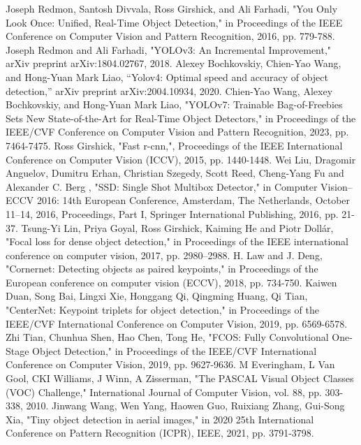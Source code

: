\documentclass[lettersize,journal]{IEEEtran}
\begin{document}
\begin{thebibliography}{99}
 Joseph Redmon, Santosh Divvala, Ross Girshick, and Ali Farhadi, "You Only Look Once: Unified, Real-Time Object Detection," in Proceedings of the IEEE Conference on Computer Vision and Pattern Recognition, 2016, pp. 779-788.
Joseph Redmon and Ali Farhadi, "YOLOv3: An Incremental Improvement," arXiv preprint arXiv:1804.02767, 2018.
Alexey Bochkovskiy, Chien-Yao Wang, and Hong-Yuan Mark Liao,
“Yolov4: Optimal speed and accuracy of object detection,” arXiv preprint
arXiv:2004.10934, 2020.
 Chien-Yao Wang, Alexey Bochkovskiy, and Hong-Yuan Mark Liao, "YOLOv7: Trainable Bag-of-Freebies Sets New State-of-the-Art for Real-Time Object Detectors," in Proceedings of the IEEE/CVF Conference on Computer Vision and Pattern Recognition, 2023, pp. 7464-7475.
Ross Girshick, "Fast r-cnn,", Proceedings of the IEEE International Conference on Computer Vision (ICCV), 2015, pp. 1440-1448.
Wei Liu, Dragomir Anguelov, Dumitru Erhan, Christian Szegedy, Scott Reed, Cheng-Yang Fu and Alexander C. Berg , "SSD: Single Shot Multibox Detector," in Computer Vision–ECCV 2016: 14th European Conference, Amsterdam, The Netherlands, October 11–14, 2016, Proceedings, Part I, Springer International Publishing, 2016, pp. 21-37.
Tsung-Yi Lin, Priya Goyal, Ross Girshick, Kaiming He and Piotr
Dollár, "Focal loss for dense object detection," in Proceedings of the
IEEE international conference on computer vision, 2017, pp. 2980–2988.
H. Law and J. Deng, "Cornernet: Detecting objects as paired keypoints," in Proceedings of the European conference on computer vision (ECCV), 2018, pp. 734-750.
Kaiwen Duan, Song Bai, Lingxi Xie, Honggang Qi, Qingming Huang, Qi Tian, "CenterNet: Keypoint triplets for object detection," in Proceedings of the IEEE/CVF International Conference on Computer Vision, 2019, pp. 6569-6578.
Zhi Tian, Chunhua Shen, Hao Chen, Tong He, "FCOS: Fully Convolutional One-Stage Object Detection," in Proceedings of the IEEE/CVF International Conference on Computer Vision, 2019, pp. 9627-9636.
M Everingham, L Van Gool, CKI Williams, J Winn, A Zisserman, "The PASCAL Visual Object Classes (VOC) Challenge," International Journal of Computer Vision, vol. 88, pp. 303-338, 2010.
Jinwang Wang, Wen Yang, Haowen Guo, Ruixiang Zhang, Gui-Song Xia, "Tiny object detection in aerial images," in 2020 25th International Conference on Pattern Recognition (ICPR), IEEE, 2021, pp. 3791-3798.
\end{thebibliography}

\newpage





\vfill
\end{document}
